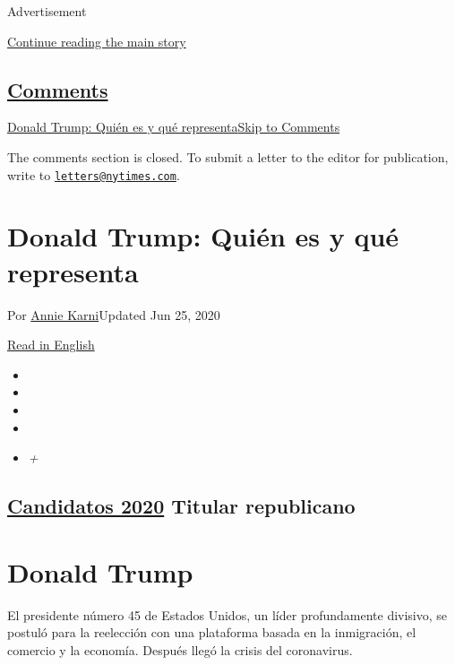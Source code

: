 Advertisement

\protect\hyperlink{after-top}{Continue reading the main story}

\hypertarget{comments}{%
\subsection{\texorpdfstring{\protect\hyperlink{commentsContainer}{Comments}}{Comments}}\label{comments}}

\href{}{Donald Trump: Quién es y qué representa}\href{}{Skip to
Comments}

The comments section is closed. To submit a letter to the editor for
publication, write to
\href{mailto:letters@nytimes.com}{\nolinkurl{letters@nytimes.com}}.

\hypertarget{donald-trump-quiuxe9n-es-y-quuxe9-representa}{%
\section{Donald Trump: Quién es y qué
representa}\label{donald-trump-quiuxe9n-es-y-quuxe9-representa}}

Por \href{https://www.nytimes.com/by/annie-karni}{Annie Karni}Updated
Jun 25, 2020

\href{https://www.nytimes.com/interactive/2020/us/elections/donald-trump.html}{Read
in English}

\begin{itemize}
\item
\item
\item
\item
\item
  \emph{+}
\end{itemize}

\hypertarget{candidatos-2020--titular-republicano-}{%
\subsection{\texorpdfstring{\href{https://www.nytimes.com/interactive/2019/us/politics/2020-presidential-candidates.html}{Candidatos
2020} Titular republicano
}{Candidatos 2020  Titular republicano }}\label{candidatos-2020--titular-republicano-}}

\hypertarget{donald-trump}{%
\section{Donald Trump}\label{donald-trump}}

El presidente número 45 de Estados Unidos, un líder profundamente
divisivo, se postuló para la reelección con una plataforma basada en la
inmigración, el comercio y la economía. Después llegó la crisis del
coronavirus.

